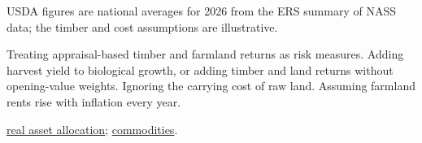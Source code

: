 \begin{qfmethod}
 USDA figures are national averages for 2026 from the ERS summary of NASS data; the timber and cost assumptions are illustrative.

 Treating appraisal-based timber and farmland returns as risk measures. Adding harvest yield to biological growth, or adding timber and land returns without opening-value weights. Ignoring the carrying cost of raw land. Assuming farmland rents rise with inflation every year.

 \hyperref[meth:real-assets-allocation]{real asset allocation}; \hyperref[def:commodity-features]{commodities}.

\end{qfmethod}
